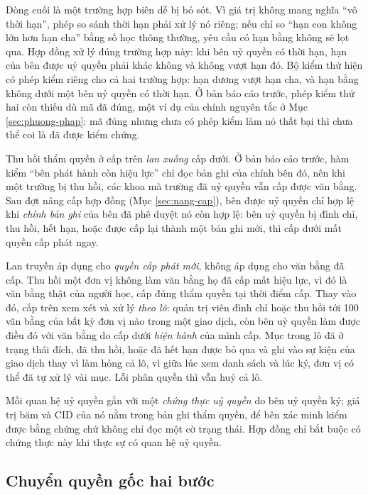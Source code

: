 Dòng cuối là một trường hợp biên dễ bị bỏ sót. Vì giá trị không mang nghĩa ``vô thời hạn'', phép so sánh thời hạn phải xử lý nó riêng; nếu chỉ so ``hạn con không lớn hơn hạn cha'' bằng số học thông thường, yêu cầu có hạn bằng không sẽ lọt qua. Hợp đồng xử lý đúng trường hợp này: khi bên uỷ quyền có thời hạn, hạn của bên được uỷ quyền phải khác không và không vượt hạn đó. Bộ kiểm thử hiện có phép kiểm riêng cho cả hai trường hợp: hạn dương vượt hạn cha, và hạn bằng không dưới một bên uỷ quyền có thời hạn. Ở bản báo cáo trước, phép kiểm thứ hai còn thiếu dù mã đã đúng, một ví dụ của chính nguyên tắc ở Mục \ref{sec:phuong-phap}: mã đúng nhưng chưa có phép kiểm làm nó thất bại thì chưa thể coi là đã được kiểm chứng.

Thu hồi thẩm quyền ở cấp trên \emph{lan xuống} cấp dưới. Ở bản báo cáo trước, hàm kiểm ``bên phát hành còn hiệu lực'' chỉ đọc bản ghi của chính bên đó, nên khi một trường bị thu hồi, các khoa mà trường đã uỷ quyền vẫn cấp được văn bằng. Sau đợt nâng cấp hợp đồng (Mục \ref{sec:nang-cap}), bên được uỷ quyền chỉ hợp lệ khi \emph{chính bản ghi} của bên đã phê duyệt nó còn hợp lệ: bên uỷ quyền bị đình chỉ, thu hồi, hết hạn, hoặc được cấp lại thành một bản ghi mới, thì cấp dưới mất quyền cấp phát ngay.

Lan truyền áp dụng cho \emph{quyền cấp phát mới}, không áp dụng cho văn bằng đã cấp. Thu hồi một đơn vị không làm văn bằng họ đã cấp mất hiệu lực, vì đó là văn bằng thật của người học, cấp đúng thẩm quyền tại thời điểm cấp. Thay vào đó, cấp trên xem xét và xử lý \emph{theo lô}: quản trị viên đình chỉ hoặc thu hồi tới 100 văn bằng của bất kỳ đơn vị nào trong một giao dịch, còn bên uỷ quyền làm được điều đó với văn bằng do cấp dưới \emph{hiện hành} của mình cấp. Mục trong lô đã ở trạng thái đích, đã thu hồi, hoặc đã hết hạn được bỏ qua và ghi vào sự kiện của giao dịch thay vì làm hỏng cả lô, vì giữa lúc xem danh sách và lúc ký, đơn vị có thể đã tự xử lý vài mục. Lỗi phân quyền thì vẫn huỷ cả lô.

Mỗi quan hệ uỷ quyền gắn với một \emph{chứng thực uỷ quyền} do bên uỷ quyền ký; giá trị băm và CID của nó nằm trong bản ghi thẩm quyền, để bên xác minh kiểm được bằng chứng chứ không chỉ đọc một cờ trạng thái. Hợp đồng chỉ bắt buộc có chứng thực này khi thực sự có quan hệ uỷ quyền.

\subsection{Chuyển quyền gốc hai bước}

